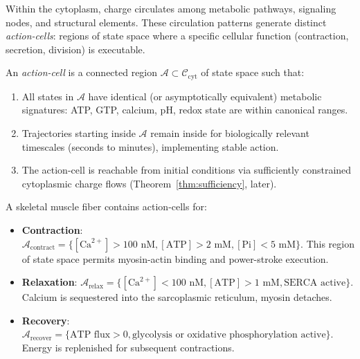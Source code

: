 Within the cytoplasm, charge circulates among metabolic pathways, signaling nodes, and structural elements. These circulation patterns generate distinct \emph{action-cells}: regions of state space where a specific cellular function (contraction, secretion, division) is executable.

\begin{definition}
\label{def:cellular-action-cell}
An \emph{action-cell} is a connected region $\mathcal{A} \subset \mathcal{C}_{\text{cyt}}$ of state space such that:
\begin{enumerate}[label=(\roman*), noitemsep]
\item All states in $\mathcal{A}$ have identical (or asymptotically equivalent) metabolic signatures: ATP, GTP, calcium, pH, redox state are within canonical ranges.
\item Trajectories starting inside $\mathcal{A}$ remain inside for biologically relevant timescales (seconds to minutes), implementing stable action.
\item The action-cell is reachable from initial conditions via sufficiently constrained cytoplasmic charge flows (Theorem~\ref{thm:sufficiency}, later).
\end{enumerate}
\end{definition}

\begin{example}
\label{ex:muscle-action-cells}
A skeletal muscle fiber contains action-cells for:
\begin{itemize}[noitemsep]
\item \textbf{Contraction}: $\mathcal{A}_{\text{contract}} = \{[\text{Ca}^{2+}] > 100\text{ nM}, [\text{ATP}]>2\text{ mM}, [\text{Pi}]<5\text{ mM}\}$. This region of state space permits myosin-actin binding and power-stroke execution.
\item \textbf{Relaxation}: $\mathcal{A}_{\text{relax}} = \{[\text{Ca}^{2+}] < 100\text{ nM}, [\text{ATP}]>1\text{ mM}, \text{SERCA active}\}$. Calcium is sequestered into the sarcoplasmic reticulum, myosin detaches.
\item \textbf{Recovery}: $\mathcal{A}_{\text{recover}} = \{\text{ATP flux}>0, \text{glycolysis or oxidative phosphorylation active}\}$. Energy is replenished for subsequent contractions.
\end{itemize}
\end{example}

